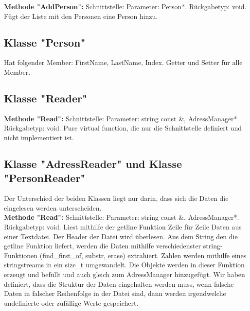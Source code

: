 \documentclass[12pt,a4paper]{article}
\begin{document}
\textbf {Methode "AddPerson": } 
\newline
Schnittstelle: Parameter: Person*. Rückgabetyp: void.
\newline
Fügt der Liste mit den Personen eine Person hinzu.
\\

\subsection {Klasse "Person"}
Hat folgender Member: FirstName, LastName, Index. Getter und Setter für alle Member. \\

\subsection {Klasse "Reader"}
\textbf {Methode "Read":}
\newline
Schnittstelle: Parameter: string const \&, AdressManager*. Rückgabetyp: void.
\newline
Pure virtual function, die nur die Schnittstelle definiert und nicht implementiert ist. \\

\subsection {Klasse "AdressReader" und Klasse "PersonReader"}
Der Unterschied der beiden Klassen liegt nur darin, dass sich die Daten die eingelesen werden unterscheiden. \\
\newline
\textbf {Methode "Read":}
\newline
Schnittstelle: Parameter: string const \&, AdressManager*. Rückgabetyp: void.
\newline
Liest mithilfe der getline Funktion Zeile für Zeile Daten aus einer Textdatei. Der Header der Datei wird überlesen. Aus dem String den die getline Funktion liefert, werden die Daten mithilfe verschiedenster string-Funktionen (find\_first\_of, substr, erase) extrahiert. Zahlen werden mithilfe eines stringstreams in ein size\_t umgewandelt.  Die Objekte werden in dieser Funktion erzeugt und befüllt und auch gleich zum AdressManager hinzugefügt. Wir haben definiert, dass die Struktur der Daten eingehalten werden muss, wenn falsche Daten in falscher Reihenfolge in der Datei sind, dann werden irgendwelche undefinierte oder zufällige Werte gespeichert. \\
\end{document}
